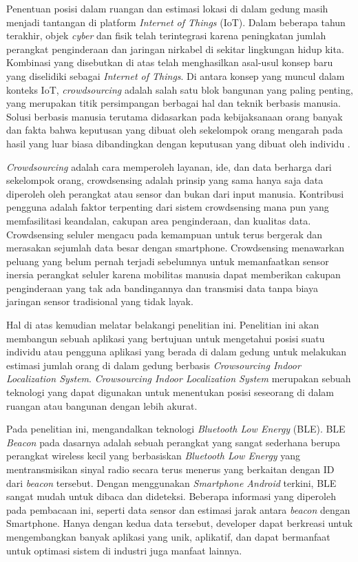 \par Penentuan posisi dalam ruangan dan estimasi lokasi di dalam gedung masih menjadi tantangan di platform \textit{Internet of Things} (IoT). Dalam beberapa tahun terakhir, objek \textit{cyber} dan fisik telah terintegrasi karena peningkatan jumlah perangkat penginderaan dan jaringan nirkabel di sekitar lingkungan hidup kita. Kombinasi yang disebutkan di atas telah menghasilkan asal-usul konsep baru yang diselidiki sebagai \textit{Internet of Things}. Di antara konsep yang muncul dalam konteks IoT, \textit{crowdsourcing} adalah salah satu blok bangunan yang paling penting, yang merupakan titik persimpangan berbagai hal dan teknik berbasis manusia. Solusi berbasis manusia terutama didasarkan pada kebijaksanaan orang banyak dan fakta bahwa keputusan yang dibuat oleh sekelompok orang mengarah pada hasil yang luar biasa dibandingkan dengan keputusan yang dibuat oleh individu \citep{Sun2019}.

\par \textit{Crowdsourcing} adalah cara memperoleh layanan, ide, dan data berharga dari sekelompok orang, crowdsensing adalah prinsip yang sama hanya saja data diperoleh oleh perangkat atau sensor dan bukan dari input manusia. Kontribusi pengguna adalah faktor terpenting dari sistem crowdsensing mana pun yang memfasilitasi keandalan, cakupan area penginderaan, dan kualitas data. Crowdsensing seluler mengacu pada kemampuan untuk terus bergerak dan merasakan sejumlah data  besar dengan smartphone. Crowdsensing menawarkan peluang yang belum pernah terjadi sebelumnya untuk memanfaatkan sensor inersia perangkat seluler karena mobilitas manusia dapat memberikan cakupan penginderaan yang tak ada bandingannya dan transmisi data tanpa biaya jaringan sensor tradisional yang tidak layak.

\par Hal di atas kemudian melatar belakangi penelitian ini. Penelitian ini akan membangun sebuah aplikasi yang bertujuan untuk mengetahui posisi suatu individu atau pengguna aplikasi yang berada di dalam gedung untuk melakukan estimasi jumlah orang di dalam gedung berbasis \textit{Crowsourcing Indoor Localization System}. \textit{Crowsourcing Indoor Localization System} merupakan   sebuah   teknologi   yang   dapat digunakan  untuk  menentukan  posisi  seseorang  di  dalam  ruangan  atau  bangunan dengan lebih akurat.

\par Pada penelitian ini, mengandalkan teknologi  \textit{Bluetooth Low Energy} (BLE).  BLE \textit{Beacon} pada dasarnya adalah sebuah perangkat yang sangat sederhana berupa perangkat wireless kecil yang berbasiskan \textit{Bluetooth Low Energy} yang mentransmisikan sinyal radio secara terus menerus yang berkaitan dengan ID dari \textit{beacon} tersebut. Dengan menggunakan \textit{Smartphone Android} terkini, BLE sangat mudah untuk dibaca dan dideteksi. Beberapa informasi yang diperoleh pada pembacaan ini, seperti data sensor dan estimasi jarak antara \textit{beacon} dengan Smartphone. Hanya dengan kedua data tersebut, developer dapat berkreasi untuk mengembangkan banyak aplikasi yang unik, aplikatif, dan dapat bermanfaat untuk optimasi sistem di industri juga manfaat lainnya.

